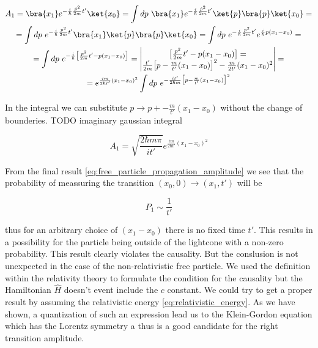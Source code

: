 \begin{equation*}
    \begin{gathered}
        A_{1} = \bra{x_{1}} e^{- \frac{i}{\hbar} \frac{\hat{p}^{2}}{2m} t'}\ket{x_{0}} = \int dp \ \bra{x_{1}} e^{- \frac{i}{\hbar} \frac{\hat{p}^{2}}{2m} t'}\ket{p} \bra{p} \ket{x_{0}} = \\
        = \int dp \ e^{- \frac{i}{\hbar} \frac{p^{2}}{2m} t'} \bra{x_{1}}\ket{p} \bra{p} \ket{x_{0}} = \int dp \ e^{- \frac{i}{\hbar} \frac{p^{2}}{2m} t'} e^{\frac{i}{\hbar}p (x_{1} - x_{0})} = \\
        = \int dp \ e^{- \frac{i}{\hbar} \big[\frac{p^{2}}{2m} t' - p (x_{1} - x_{0})\big]} = 
        \begin{vmatrix}
            \big[\frac{p^{2}}{2m} t' - p (x_{1} - x_{0})\big] =  \\
            \frac{t'}{2m} \big[p - \frac{m}{t'}(x_{1} - x_{0})\big]^{2} - \frac{m}{2t'}(x_{1} - x_{0})^{2} \\
        \end{vmatrix} = \\
        = e^{\frac{im}{2\hbar t'} (x_{1} - x_{0})^{2}} \int dp \ e^{- \frac{i t'}{2 \hbar m} \big[p - \frac{m}{t'}(x_{1} - x_{0})\big]^{2}} \\
    \end{gathered}
\end{equation*}

In the integral we can substitute $p \to p + - \frac{m}{t'}(x_{1} - x_{0})$ without the change of bounderies. TODO imaginary gaussian integral

\begin{equation}
    \label{eq:free_particle_propagation_amplitude}
    A_{1} = \sqrt{\frac{2 \hbar m \pi}{i t'}} e^{\frac{im}{2\hbar t'} (x_{1} - x_{0})^{2}}
\end{equation}

From the final result \ref{eq:free_particle_propagation_amplitude}  we see that the probability of meassuring the
transition $(x_{0}, 0) \to (x_{1}, t')$ will be

\begin{equation*}
    P_{1} \sim \frac{1}{t'}
\end{equation*}

thus for an arbitrary choice of $(x_{1} - x_{0})$ there is no fixed time $t'$. This results in a possibility for the particle
being outside of the lightcone with a non-zero probability. This result clearly violates the causality. But the conslusion is
not unexpected in the case of the non-relativistic free particle. We used the definition within the relativity theory to 
formulate the condition for the causality but the Hamiltonian $\hat{H}$ doesn't event include the $c$ constant. We could try
to get a proper result by assuming the relativistic energy \ref{eq:relativistic_energy}. As we have shown, a quantization of such an
expression lead us to the Klein-Gordon equation which has the Lorentz symmetry a thus is a good candidate for the right transition
amplitude.

